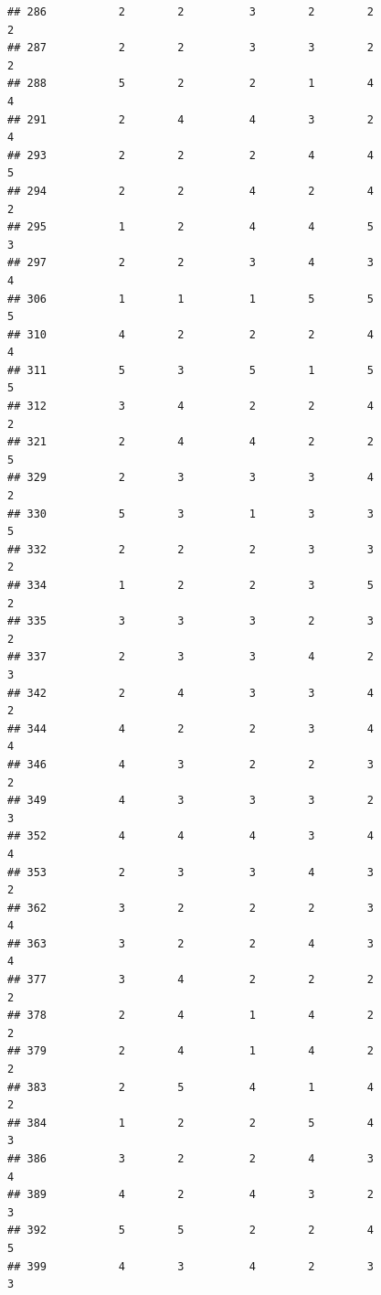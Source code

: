 \documentclass[
]{article}
\begin{document}
\begin{verbatim}
## 286           2        2          3        2        2               2
## 287           2        2          3        3        2               2
## 288           5        2          2        1        4               4
## 291           2        4          4        3        2               4
## 293           2        2          2        4        4               5
## 294           2        2          4        2        4               2
## 295           1        2          4        4        5               3
## 297           2        2          3        4        3               4
## 306           1        1          1        5        5               5
## 310           4        2          2        2        4               4
## 311           5        3          5        1        5               5
## 312           3        4          2        2        4               2
## 321           2        4          4        2        2               5
## 329           2        3          3        3        4               2
## 330           5        3          1        3        3               5
## 332           2        2          2        3        3               2
## 334           1        2          2        3        5               2
## 335           3        3          3        2        3               2
## 337           2        3          3        4        2               3
## 342           2        4          3        3        4               2
## 344           4        2          2        3        4               4
## 346           4        3          2        2        3               2
## 349           4        3          3        3        2               3
## 352           4        4          4        3        4               4
## 353           2        3          3        4        3               2
## 362           3        2          2        2        3               4
## 363           3        2          2        4        3               4
## 377           3        4          2        2        2               2
## 378           2        4          1        4        2               2
## 379           2        4          1        4        2               2
## 383           2        5          4        1        4               2
## 384           1        2          2        5        4               3
## 386           3        2          2        4        3               4
## 389           4        2          4        3        2               3
## 392           5        5          2        2        4               5
## 399           4        3          4        2        3               3

\end{verbatim}
\end{document}

